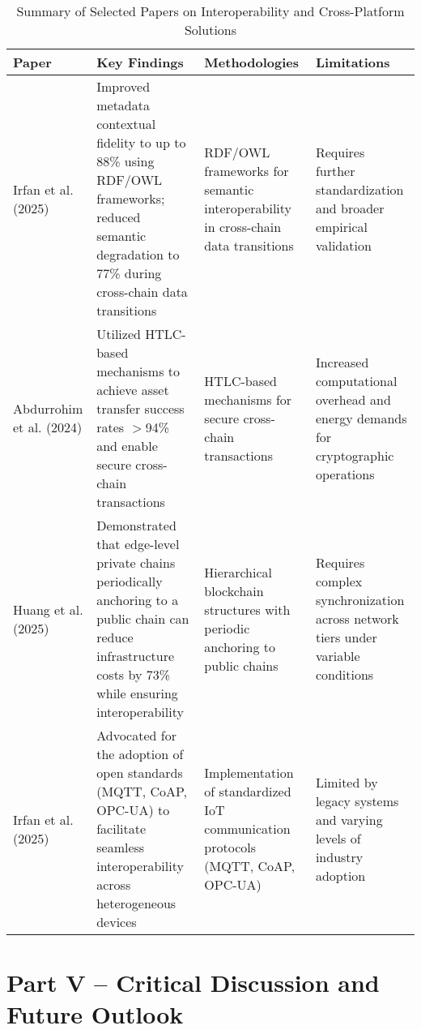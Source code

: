 \documentclass[12pt,onecolumn]{IEEEtran} %
\newcommand{\fitToPage}[1]{\begin{adjustbox}{max width=\textwidth}#1\end{adjustbox}}
\renewcommand{\arraystretch}{1.2} %
\begin{document}
\begin{table}[htbp]
\caption{Summary of Selected Papers on Interoperability and Cross-Platform Solutions}
\label{tab:interoperability}
\centering
\fitToPage{
\begingroup
\setlength{\tabcolsep}{4pt}
\renewcommand{\arraystretch}{1.15}
\footnotesize
\begin{tabularx}{\textwidth}{@{}P{0.18\textwidth}YYY@{}}
\toprule
\textbf{Paper} & \textbf{Key Findings} & \textbf{Methodologies} & \textbf{Limitations} \\
\midrule
Irfan et al. (2025) & Improved metadata contextual fidelity to up to 88\% using RDF/OWL frameworks; reduced semantic degradation to 77\% during cross-chain data transitions & RDF/OWL frameworks for semantic interoperability in cross-chain data transitions & Requires further standardization and broader empirical validation \\
\addlinespace
Abdurrohim et al. (2024) & Utilized HTLC-based mechanisms to achieve asset transfer success rates $>$94\% and enable secure cross-chain transactions & HTLC-based mechanisms for secure cross-chain transactions & Increased computational overhead and energy demands for cryptographic operations \\
\addlinespace
Huang et al. (2025) & Demonstrated that edge-level private chains periodically anchoring to a public chain can reduce infrastructure costs by 73\% while ensuring interoperability & Hierarchical blockchain structures with periodic anchoring to public chains & Requires complex synchronization across network tiers under variable conditions \\
\addlinespace
Irfan et al. (2025) & Advocated for the adoption of open standards (MQTT, CoAP, OPC-UA) to facilitate seamless interoperability across heterogeneous devices & Implementation of standardized IoT communication protocols (MQTT, CoAP, OPC-UA) & Limited by legacy systems and varying levels of industry adoption \\
\bottomrule
\end{tabularx}
\endgroup
}
\end{table}

\part*{Part V – Critical Discussion and Future Outlook}
\end{document}
